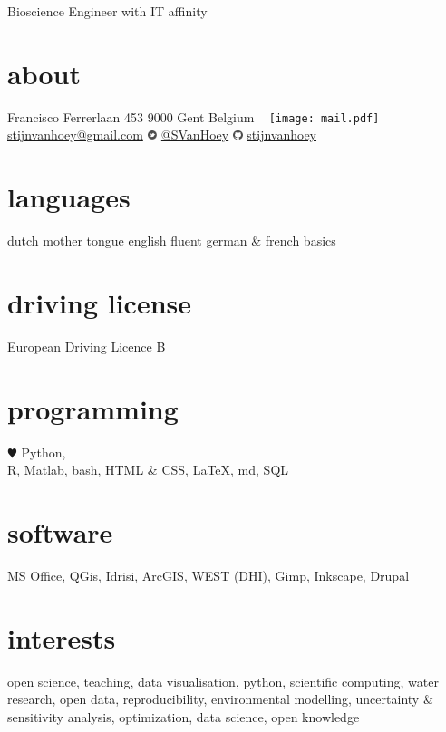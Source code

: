 \documentclass[]{stvhoey-cv}  %
\begin{document}
       {Bioscience Engineer with IT affinity}%

\begin{aside}
  \section{about}
    Francisco Ferrerlaan 453
    9000 Gent
    Belgium
    ~
    \texttt{[image: mail.pdf]}   \href{mailto:stijnvanhoey@gmail.com}{stijnvanhoey@gmail.com} 
    	\includegraphics[height=8pt]{twitter.pdf} \href{https://twitter.com/svanhoey}{@SVanHoey}
	\includegraphics[height=8pt]{github.pdf} \href{http://github.com/stijnvanhoey}{stijnvanhoey}%
  \section{languages}
    dutch mother tongue
    english fluent
   german \&  french basics
  \section{driving license}
  European Driving
  Licence B
  \section{programming}
   {\color{red} $\varheartsuit$} Python,\\%
    R, Matlab, bash,
    HTML \& CSS,
    \LaTeX, md,
    SQL
  \section{software}
   MS Office,
   QGis, Idrisi, ArcGIS,
   WEST (DHI),
   Gimp, Inkscape,
   Drupal
\end{aside}
   
\section{interests}
open science, teaching, data visualisation, python, scientific computing, water research, open data, reproducibility, environmental modelling, uncertainty \& sensitivity analysis, optimization, data science, open knowledge \vspace{\baselineskip}
\end{document}
